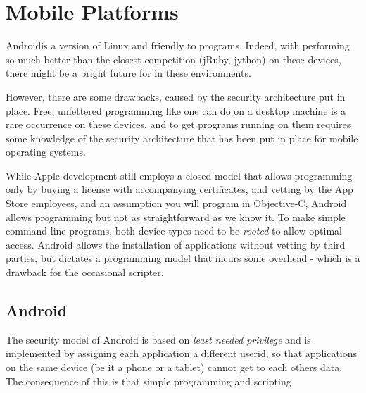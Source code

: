 \section{Mobile Platforms}
Android\texttrademark is a version of Linux and friendly to \nr{}
programs. Indeed, with \nr{} performing so much better than the closest
competition (jRuby, jython) on these devices, there might be a bright
future for \nr{} in these environments. 

However, there are some drawbacks, caused by the security architecture
put in place. Free, unfettered programming like one can do on a
desktop machine is a rare occurrence on these devices, and to get
programs running on them requires some knowledge of the security
architecture that has been put in place for mobile operating systems.

While Apple development still employs a closed model that allows programming only by
buying a license with accompanying certificates, and vetting by the
App Store employees, and an assumption you will program in
Objective-C, Android allows programming but not as straightforward as
we know it. To make simple command-line \nr{} programs, both device
types need to be \emph{rooted} to allow optimal access. Android allows
the installation of applications without vetting by third parties, but
dictates a programming model that incurs some overhead - which is a
drawback for the occasional scripter.
\subsection{Android}
The security model of Android is based on \emph{least needed
  privilege} and is implemented by assigning each application a
different userid, so that applications on the same device (be it a
phone or a tablet) cannot get to each others data. The consequence of
this is that simple \nr{} programming and scripting 
